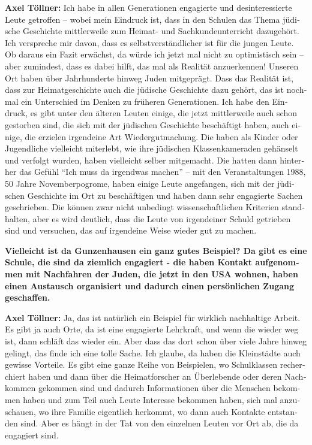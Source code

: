 \begin{otherlanguage}{ngerman}
\textbf{Axel Töllner:} Ich habe in allen Generationen engagierte und desinteressierte Leute getroffen – wobei mein Eindruck ist, dass in den Schulen das Thema jüdische Geschichte mittlerweile zum Heimat- und Sachkundeunterricht dazugehört. Ich verspreche mir davon, dass es selbstverständlicher ist für die jungen Leute. Ob daraus ein Fazit erwächst, da würde ich jetzt mal nicht zu optimistisch sein – aber zumindest, dass es dabei hilft, das mal als Realität anzuerkennen! Unseren Ort haben über Jahrhunderte hinweg Juden mitgeprägt. Dass das Realität ist, dass zur Heimatgeschichte auch die jüdische Geschichte dazu gehört, das ist nochmal ein Unterschied im Denken zu früheren Generationen. Ich habe den Eindruck, es gibt unter den älteren Leuten einige, die jetzt mittlerweile auch schon gestorben sind, die sich mit der jüdischen Geschichte beschäftigt haben, auch einige, die erzielen irgendeine Art Wiedergutmachung. Die haben als Kinder oder Jugendliche vielleicht miterlebt, wie ihre jüdischen Klassenkameraden gehänselt und verfolgt wurden, haben vielleicht selber mitgemacht. Die hatten dann hinterher das Gefühl "`Ich muss da irgendwas machen"' – mit den Veranstaltungen 1988, 50 Jahre Novemberpogrome, haben einige Leute angefangen, sich mit der jüdischen Geschichte im Ort zu beschäftigen und haben dann sehr engagierte Sachen geschrieben. Die können zwar nicht unbedingt wissenschaftlichen Kriterien standhalten, aber es wird deutlich, dass die Leute von irgendeiner Schuld getrieben sind und versuchen, das auf irgendeine Weise wieder gut zu machen. 

\textbf{Vielleicht ist da Gunzenhausen ein ganz gutes Beispiel? Da gibt es eine Schule, die sind da ziemlich engagiert - die haben Kontakt aufgenommen mit Nachfahren der Juden, die jetzt in den USA wohnen, haben einen Austausch organisiert und dadurch einen persönlichen Zugang geschaffen.}
 
\textbf{Axel Töllner:} Ja, das ist natürlich ein Beispiel für wirklich nachhaltige Arbeit. Es gibt ja auch Orte, da ist eine engagierte Lehrkraft, und wenn die wieder weg ist, dann schläft das wieder ein. Aber dass das dort schon über viele Jahre hinweg gelingt, das finde ich eine tolle Sache. Ich glaube, da haben die Kleinstädte auch gewisse Vorteile.  
Es gibt eine ganze Reihe von Beispielen, wo Schulklassen recherchiert haben und dann über die Heimatforscher an Überlebende oder deren Nachkommen gekommen sind und dadurch Informationen über die Menschen bekommen haben und zum Teil auch Leute Interesse bekommen haben, sich mal anzuschauen, wo ihre Familie eigentlich herkommt, wo dann auch Kontakte entstanden sind. Aber es hängt in der Tat von den einzelnen Leuten vor Ort ab, die da engagiert sind. 


\end{otherlanguage}
